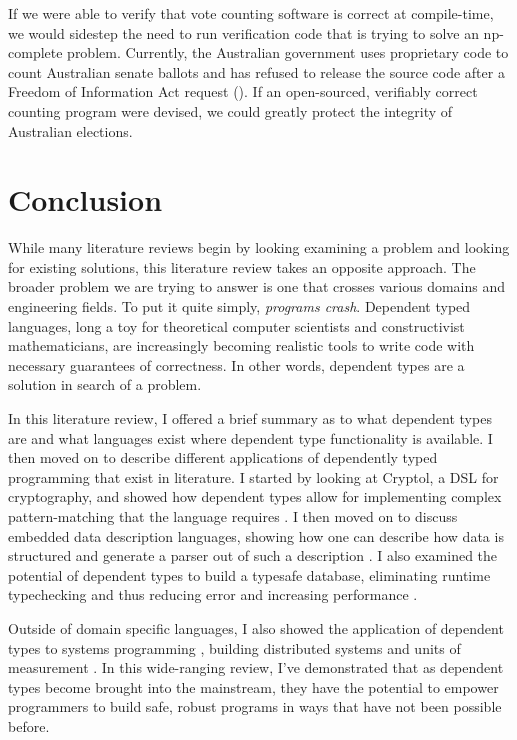 If we were able to verify that vote counting software is correct at
compile-time, we would sidestep the need to run verification code that is trying
to solve an np-complete problem. Currently, the Australian government uses
proprietary code to count Australian senate ballots and has refused to release
the source code after a Freedom of Information Act request
(\cite{aus_senate_news}). If an open-sourced, verifiably correct counting
program were devised, we could greatly protect the integrity of Australian
elections. 

\section{Conclusion}
While many literature reviews begin by looking examining a problem and looking
for existing solutions, this literature review takes an opposite approach. The
broader problem we are trying to answer is one that crosses various domains and
engineering fields. To put it quite simply, \textit{programs crash}. Dependent
typed languages, long a toy for theoretical computer scientists and
constructivist mathematicians, are increasingly becoming realistic tools to
write code with necessary guarantees of correctness. In other words, dependent
types are a solution in search of a problem. 

In this literature review, I offered a brief summary as to what dependent types
are and what languages exist where dependent type functionality is available. I
then moved on to describe different applications of dependently typed
programming that exist in literature. I started by looking at Cryptol, a DSL for
cryptography, and showed how dependent types allow for implementing complex
pattern-matching that the language requires \cite{power_of_pi}. I then moved on
to discuss embedded data description languages, showing how one can describe how
data is structured and generate a parser out of such a description
\cite{power_of_pi}. I also examined the potential of dependent types to build a
typesafe database, eliminating runtime typechecking and thus reducing error and
increasing performance \cite{power_of_pi, eisenberg2016}. 

Outside of domain specific languages, I also showed the application of dependent
types to systems programming \cite{idris_systems_programming}, building
distributed systems \cite{fstar_distributed_programming} and units of
measurement \cite{gundry2013}. In this wide-ranging review, I've demonstrated
that as dependent types become brought into the mainstream, they have the
potential to empower programmers to build safe, robust programs in ways that
have not been possible before. 